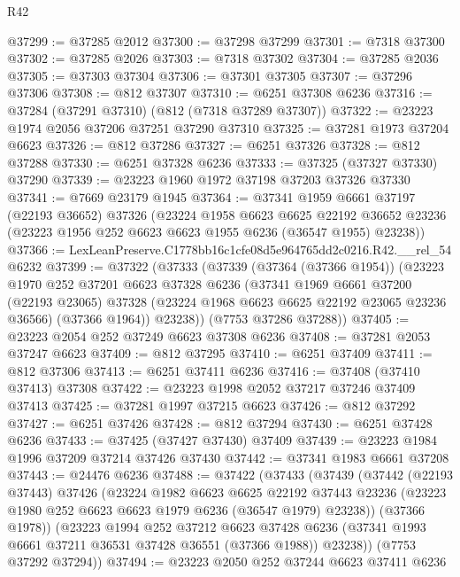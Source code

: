 \begin{lexlean}{R42}
\begin{coremodule}
{@37299 := @37285 @2012
@37300 := @37298 @37299
@37301 := @7318 @37300
@37302 := @37285 @2026
@37303 := @7318 @37302
@37304 := @37285 @2036
@37305 := @37303 @37304
@37306 := @37301 @37305
@37307 := @37296 @37306
@37308 := @812 @37307
@37310 := @6251 @37308 @6236
@37316 := @37284 (@37291 @37310) (@812 (@7318 @37289 @37307))
@37322 := @23223 @1974 @2056 @37206 @37251 @37290 @37310
@37325 := @37281 @1973 @37204 @6623
@37326 := @812 @37286
@37327 := @6251 @37326
@37328 := @812 @37288
@37330 := @6251 @37328 @6236
@37333 := @37325 (@37327 @37330) @37290
@37339 := @23223 @1960 @1972 @37198 @37203 @37326 @37330
@37341 := @7669 @23179 @1945
@37364 := @37341
    @1959
    @6661
    @37197
    (@22193 @36652)
    @37326
    (@23224
      @1958
      @6623
      @6625
      @22192
      @36652
      @23236
      (@23223 @1956 @252 @6623 @6623 @1955 @6236 (@36547 @1955) @23238))
@37366 := LexLeanPreserve.C1778bb16c1cfe08d5e964765dd2c0216.R42.__rel_54 @6232
@37399 := @37322
    (@37333
      (@37339
        (@37364 (@37366 @1954))
        (@23223
          @1970
          @252
          @37201
          @6623
          @37328
          @6236
          (@37341
            @1969
            @6661
            @37200
            (@22193 @23065)
            @37328
            (@23224 @1968 @6623 @6625 @22192 @23065 @23236 @36566)
            (@37366 @1964))
          @23238))
      (@7753 @37286 @37288))
@37405 := @23223 @2054 @252 @37249 @6623 @37308 @6236
@37408 := @37281 @2053 @37247 @6623
@37409 := @812 @37295
@37410 := @6251 @37409
@37411 := @812 @37306
@37413 := @6251 @37411 @6236
@37416 := @37408 (@37410 @37413) @37308
@37422 := @23223 @1998 @2052 @37217 @37246 @37409 @37413
@37425 := @37281 @1997 @37215 @6623
@37426 := @812 @37292
@37427 := @6251 @37426
@37428 := @812 @37294
@37430 := @6251 @37428 @6236
@37433 := @37425 (@37427 @37430) @37409
@37439 := @23223 @1984 @1996 @37209 @37214 @37426 @37430
@37442 := @37341 @1983 @6661 @37208
@37443 := @24476 @6236
@37488 := @37422
    (@37433
      (@37439
        (@37442
          (@22193 @37443)
          @37426
          (@23224
            @1982
            @6623
            @6625
            @22192
            @37443
            @23236
            (@23223 @1980 @252 @6623 @6623 @1979 @6236 (@36547 @1979) @23238))
          (@37366 @1978))
        (@23223
          @1994
          @252
          @37212
          @6623
          @37428
          @6236
          (@37341 @1993 @6661 @37211 @36531 @37428 @36551 (@37366 @1988))
          @23238))
      (@7753 @37292 @37294))
@37494 := @23223 @2050 @252 @37244 @6623 @37411 @6236
}
\end{coremodule}
\end{lexlean}
